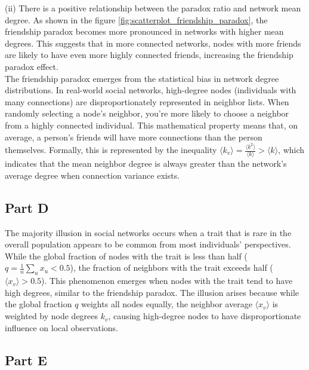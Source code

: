 \documentclass[12pt]{article}
\begin{document}
\noindent (ii) There is a positive relationship between the paradox ratio and network mean degree. As shown in the figure \ref{fig:scatterplot_friendship_paradox}, the friendship paradox becomes more pronounced in networks with higher mean degrees. This suggests that in more connected networks, nodes with more friends are likely to have even more highly connected friends, increasing the friendship paradox effect.\\

\noindent The friendship paradox emerges from the statistical bias in network degree distributions. In real-world social networks, high-degree nodes (individuals with many connections) are disproportionately represented in neighbor lists. When randomly selecting a node's neighbor, you're more likely to choose a neighbor from a highly connected individual. This mathematical property means that, on average, a person's friends will have more connections than the person themselves. Formally, this is represented by the inequality $\langle k_v \rangle = \frac{\langle k^2 \rangle}{\langle k \rangle} > \langle k \rangle$, which indicates that the mean neighbor degree is always greater than the network's average degree when connection variance exists.

\subsection*{Part D}

The majority illusion in social networks occurs when a trait that is rare in the overall population appears to be common from most individuals' perspectives. While the global fraction of nodes with the trait is less than half ($q = \frac{1}{n}\sum_u x_u < 0.5$), the fraction of neighbors with the trait exceeds half ($\langle x_v \rangle > 0.5$). This phenomenon emerges when nodes with the trait tend to have high degrees, similar to the friendship paradox. The illusion arises because while the global fraction $q$ weights all nodes equally, the neighbor average $\langle x_v \rangle$ is weighted by node degrees $k_v$, causing high-degree nodes to have disproportionate influence on local observations.

\subsection*{Part E}
\end{document}
